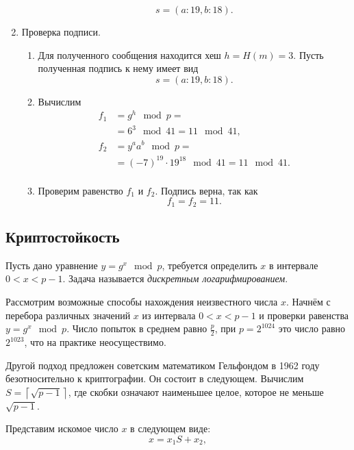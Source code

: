 \begin{enumerate}
\begin{enumerate}
                \[ s = (a:19, b:18). \]
        \end{enumerate}
    \item Проверка подписи.
        \begin{enumerate}
            \item Для полученного сообщения находится хеш $h = H(m) = 3$. Пусть полученная подпись к нему имеет вид
                \[ s = (a:19, b:18). \]
            \item Вычислим
                \[ \begin{array}{ll}
                    f_1 & = g^h \mod p = \\
                        & = 6^3 \mod 41 = 11 \mod 41, \\
                    f_2 & = y^a a^b \mod p = \\
                        & = (-7)^{19} \cdot 19^{18} \mod 41 = 11 \mod 41. \\
                \end{array} \]
            \item Проверим равенство $f_1$ и $f_2$. Подпись верна, так как
                \[ f_1 = f_2 = 11. \]
        \end{enumerate}
\end{enumerate}

\exampleend
{}

\subsection{Криптостойкость}

Пусть дано уравнение $y=g^{x} \mod p$, требуется определить $x$ в интервале $0 < x < p-1$. Задача называется \emph{дискретным логарифмированием}.

Рассмотрим возможные способы нахождения неизвестного числа $x$. Начнём с перебора различных значений $x$ из интервала $0<x<p-1$ и проверки равенства $y=g^{x} \mod p$. Число попыток в среднем равно $\frac{p}{2}$, при $p=2^{1024}$ это число равно $2^{1023}$, что на практике неосуществимо.

Другой подход предложен советским математиком Гельфондом в 1962 году безотносительно к криптографии. Он состоит в следующем.
Вычислим $S=\left\lceil\sqrt{p-1}\right\rceil $, где скобки означают наименьшее целое, которое не меньше $\sqrt{p-1} $.

Представим искомое число $x$ в следующем виде:
\begin{equation}
    x=x_{1} S+x_{2},
    \label{S}
\end{equation}

